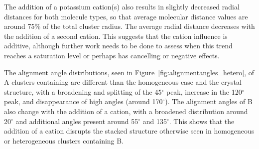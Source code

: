 The addition of a potassium cation(s) also results in slightly %
decreased radial distances for both molecule types, so that average molecular distance values are around 75\% of the total cluster radius. The average radial distance decreases with the addition of a second cation. %
This suggests that the cation influence is additive, although further work needs to be done to assess when this trend reaches a saturation level or perhaps has cancelling or negative effects. 



The alignment angle distributions, seen in Figure~\ref{fig:alignmentangles_hetero}, of A clusters containing  are different than the homogeneous case and the crystal structure, with a broadening and splitting of the 45$^{\circ}$ peak, increase in the 120$^{\circ}$ peak, and disappearance of high angles (around 170$^{\circ}$). The alignment angles of B also change with the addition of a cation, with a broadened distribution around 20$^{\circ}$ and additional angles present around 55$^{\circ}$ and 135$^{\circ}$. This shows that the addition of a cation disrupts the stacked structure otherwise seen in homogeneous or heterogeneous clusters containing B. 

